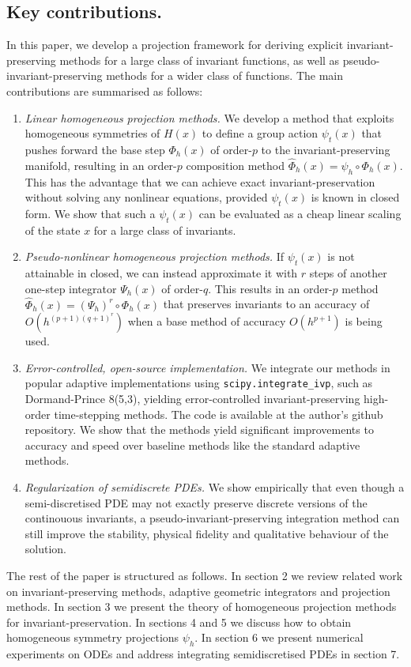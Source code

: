 \documentclass[final,3p,times]{elsarticle}
\begin{document}
\subsection{Key contributions.}
In this paper, we develop a projection framework for deriving explicit invariant-preserving methods for a large class of invariant functions, as well as pseudo-invariant-preserving methods for a wider class of functions. The main contributions are summarised as follows:
\begin{enumerate}
\item \textit{Linear homogeneous projection methods.} We develop a method that exploits homogeneous symmetries of $H(x)$ to define a group action $\psi_t(x)$ that pushes forward the base step $\Phi_h(x)$ of order-$p$ to the invariant-preserving manifold, resulting in an order-$p$ composition method $\widehat{\Phi}_h(x) = \psi_h\circ\Phi_h(x)$. This has the advantage that we can achieve exact invariant-preservation without solving any nonlinear equations, provided $\psi_t(x)$ is known in closed form. We show that such a $\psi_t(x)$ can be evaluated as a cheap linear scaling of the state $x$ for a large class of invariants.
\item \textit{Pseudo-nonlinear homogeneous projection methods.} If $\psi_t(x)$ is not attainable in closed, we can instead approximate it with $r$ steps of another one-step integrator $\Psi_h(x)$ of order-$q$. This results in an order-$p$ method $\widehat{\Phi}_h(x) = \left(\Psi_h\right)^{r}\circ\Phi_h(x)$ that preserves invariants to an accuracy of $O(h^{(p+1)(q+1)^r})$ when a base method of accuracy $O(h^{p+1})$ is being used.
\item \textit{Error-controlled, open-source implementation.} We integrate our methods in popular adaptive implementations using \texttt{scipy.integrate\_ivp}, such as Dormand-Prince 8(5,3), yielding error-controlled invariant-preserving high-order time-stepping methods. The code is available at the author's github repository. We show that the methods yield significant improvements to accuracy and speed over baseline methods like the standard adaptive methods.
\item \textit{Regularization of semidiscrete PDEs.} We show empirically that even though a semi-discretised PDE may not exactly preserve discrete versions of the continouous invariants, a pseudo-invariant-preserving integration method can still improve the stability, physical fidelity and qualitative behaviour of the solution.
\end{enumerate}
The rest of the paper is structured as follows. In section 2 we review related work on invariant-preserving methods, adaptive geometric integrators and projection methods. In section 3 we present the theory of homogeneous projection methods for invariant-preservation. In sections 4 and 5 we discuss how to obtain homogeneous symmetry projections $\psi_h$. In section 6 we present numerical experiments on ODEs and address integrating semidiscretised PDEs in section 7. 
\end{document}
